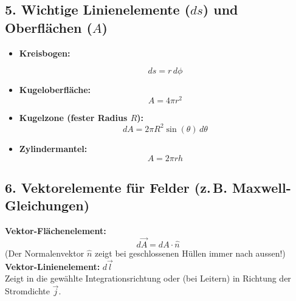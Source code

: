 \subsection*{5. Wichtige Linienelemente ($ds$) und Oberflächen ($A$)}
\begin{itemize}
	\item \textbf{Kreisbogen:}
	\begin{formulabox}
		\[
		ds = r \, d\phi
		\]
	\end{formulabox}
	
	\item \textbf{Kugeloberfläche:}
	\[
	A = 4\pi r^2
	\]
	
	\item \textbf{Kugelzone (fester Radius $R$):}
	\[
	dA = 2\pi R^2 \sin(\theta) \, d\theta
	\]
	
	\item \textbf{Zylindermantel:}
	\[
	A = 2\pi r h
	\]
\end{itemize}

\subsection*{6. Vektorelemente für Felder (z.\,B. Maxwell-Gleichungen)}
\textbf{Vektor-Flächenelement:}
\[
d\vec{A} = dA \cdot \hat{n}
\]
(Der Normalenvektor $\hat{n}$ zeigt bei geschlossenen Hüllen immer nach aussen!) \\[1ex]
\textbf{Vektor-Linienelement:} $d\vec{l}$ \\
Zeigt in die gewählte Integrationsrichtung oder (bei Leitern) in Richtung der Stromdichte $\vec{j}$.